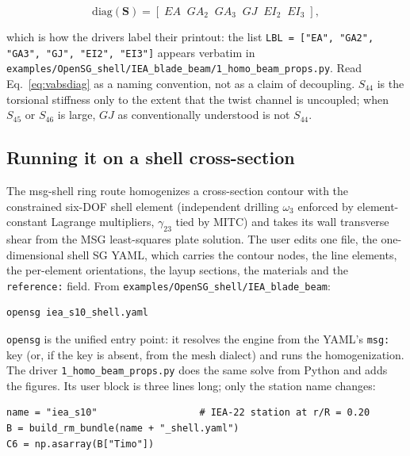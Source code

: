 \begin{equation}
\mathrm{diag}(\mathbf S) = \left[\;EA\;\;GA_2\;\;GA_3\;\;GJ\;\;EI_2\;\;EI_3\;\right],
\label{eq:vabsdiag}
\end{equation}

which is how the drivers label their printout: the list
\verb|LBL = ["EA", "GA2", "GA3", "GJ", "EI2", "EI3"]| appears verbatim in
\texttt{examples/OpenSG\_shell/IEA\_blade\_beam/1\_homo\_beam\_props.py}. Read
Eq.~\eqref{eq:vabsdiag} as a naming convention, not as a claim of
decoupling. $S_{44}$ is the torsional stiffness only to the extent that the
twist channel is uncoupled; when $S_{45}$ or $S_{46}$ is large, $GJ$ as
conventionally understood is not $S_{44}$.

\subsection{Running it on a shell cross-section}

The msg-shell ring route homogenizes a cross-section contour with the
constrained six-DOF shell element (independent drilling $\omega_3$ enforced by
element-constant Lagrange multipliers, $\gamma_{23}$ tied by MITC) and takes
its wall transverse shear from the MSG least-squares plate solution. The user
edits one file, the one-dimensional shell SG YAML, which carries the contour
nodes, the line elements, the per-element orientations, the layup sections, the
materials and the \texttt{reference:} field. From
\texttt{examples/OpenSG\_shell/IEA\_blade\_beam}:

\begin{lstlisting}[style=shellst]
opensg iea_s10_shell.yaml
\end{lstlisting}

\texttt{opensg} is the unified entry point: it resolves the engine from the
YAML's \texttt{msg:} key (or, if the key is absent, from the mesh dialect) and
runs the homogenization. The driver \texttt{1\_homo\_beam\_props.py} does the
same solve from Python and adds the figures. Its user block is three lines
long; only the station name changes:

\begin{lstlisting}[style=opensg,caption={The complete user input of the shell beam driver. build\_rm\_bundle reads iea\_s10\_shell.yaml.}]
name = "iea_s10"                  # IEA-22 station at r/R = 0.20
B = build_rm_bundle(name + "_shell.yaml")
C6 = np.asarray(B["Timo"])
\end{lstlisting}


